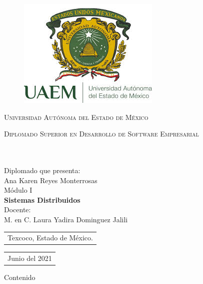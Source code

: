 \documentclass[11pt]{article}
\author{Ana Karen Reyes Monterrosas}
\title{}
\begin{document}
\begin{titlepage}
	\begin{figure}[h!]
		\centering
		{\includegraphics[scale=.7]{uaemex.jpg}\par} \vspace{1cm}
	\end{figure}
\begin{center}
{\scshape\LARGE \textsc{\LARGE Universidad Autónoma del Estado de México}\par}\vspace{1.5cm} 
\textsc{\Large Diplomado Superior en Desarrollo de Software Empresarial}\\[1cm] 
\HRule \\[0.2cm] 
{\Large \bfseries \ttitle\par}\vspace{0.1cm} 
\HRule \\[0.4cm] 
\Large {Diplomado que presenta:}\\
\Large {{Ana Karen Reyes Monterrosas}{\authorname} }\\ 
\bigskip\vspace{1cm}
\Large{Módulo I}\\
\Large{\textbf{Sistemas Distribuidos}}\\
\bigskip\vspace{1cm}
\Large{Docente:}\\
\Large{{M. en C. Laura Yadira Dominguez Jalili}{\supname} }\\
\vspace{2.5cm}
\noindent
\begin{tabular}[t]{@{}l} 
  Texcoco, Estado de México.
\end{tabular}
\hfill
\begin{tabular}[t]{l@{}}
   Junio del 2021
\end{tabular}
 \vfill
\end{center}
\end{titlepage}

{\raggedright
{\LARGE Contenido}
}
\tableofcontents

\printbibliography




\end{document}

